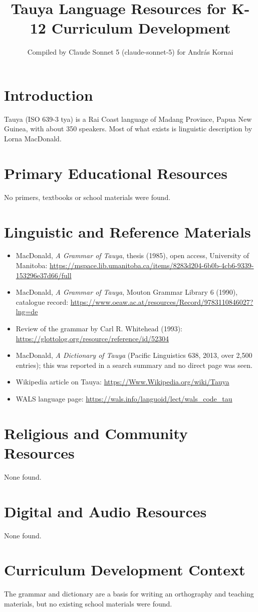 \documentclass[12pt]{article}
\title{Tauya Language Resources for K-12 Curriculum Development}
\author{Compiled by Claude Sonnet 5 (claude-sonnet-5) for Andr\'as Kornai}
\date{}
\begin{document}
\maketitle

\section{Introduction}
Tauya (ISO 639-3 tya) is a Rai Coast language of Madang Province, Papua New Guinea, with about 350 speakers. Most of what exists is linguistic description by Lorna MacDonald.

\section{Primary Educational Resources}
No primers, textbooks or school materials were found.

\section{Linguistic and Reference Materials}
\begin{itemize}
\item MacDonald, \emph{A Grammar of Tauya}, thesis (1985), open access, University of Manitoba: \url{https://mspace.lib.umanitoba.ca/items/8283d204-6b0b-4cb6-9339-153296e37d66/full}
\item MacDonald, \emph{A Grammar of Tauya}, Mouton Grammar Library 6 (1990), catalogue record: \url{https://www.oeaw.ac.at/resources/Record/9783110846027?lng=de}
\item Review of the grammar by Carl R. Whitehead (1993): \url{https://glottolog.org/resource/reference/id/52304}
\item MacDonald, \emph{A Dictionary of Tauya} (Pacific Linguistics 638, 2013, over 2,500 entries); this was reported in a search summary and no direct page was seen.
\item Wikipedia article on Tauya: \url{https://Www.Wikipedia.org/wiki/Tauya}
\item WALS language page: \url{https://wals.info/languoid/lect/wals_code_tau}
\end{itemize}

\section{Religious and Community Resources}
None found.

\section{Digital and Audio Resources}
None found.

\section{Curriculum Development Context}
The grammar and dictionary are a basis for writing an orthography and teaching materials, but no existing school materials were found.
\end{document}
